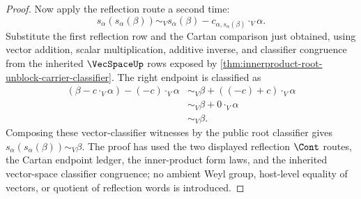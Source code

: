 \begin{proof}
Now apply the reflection route a second time:
$$
s_\alpha(s_\alpha(\beta))
\sim_V
s_\alpha(\beta)-c_{\alpha,s_\alpha(\beta)}\cdot_V\alpha.
$$
Substitute the first reflection row and the Cartan comparison just obtained, using vector addition, scalar multiplication, additive inverse, and classifier congruence from the inherited $\VecSpaceUp$ rows exposed by \autoref{thm:innerproduct-root-unblock-carrier-classifier}. The right endpoint is classified as
$$
\begin{aligned}
(\beta-c\cdot_V\alpha)-(-c)\cdot_V\alpha
&\sim_V
\beta+((-c)+c)\cdot_V\alpha \\
&\sim_V
\beta+0\cdot_V\alpha \\
&\sim_V
\beta.
\end{aligned}
$$
Composing these vector-classifier witnesses by the public root classifier gives
$s_\alpha(s_\alpha(\beta))\sim_V\beta$. The proof has used the two displayed reflection $\Cont$ routes, the Cartan endpoint ledger, the inner-product form laws, and the inherited vector-space classifier congruence; no ambient Weyl group, host-level equality of vectors, or quotient of reflection words is introduced.
\end{proof}

